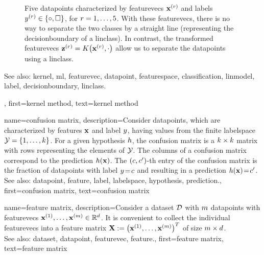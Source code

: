 {{\begin{figure}[H]
\begin{center}
\end{center}
\caption{
Five \glspl{datapoint} characterized by \glspl{featurevec} ${\bf x}^{(r)}$ 
and \glspl{label} $y^{(r)} \in \{ \circ, \square \}$, for $r=1,\ldots,5$. 
With these \glspl{featurevec}, there is no way to separate the two classes 
by a straight line (representing the \gls{decisionboundary} of a \gls{linclass}). 
In contrast, the transformed \glspl{featurevec} ${\bf z}^{(r)} = K\big({\bf x}^{(r)},\cdot\big)$ 
allow us to separate the \glspl{datapoint} using a \gls{linclass}.  \label{fig_linsep_kernel_dict}}
\end{figure}
		See also: \gls{kernel}, \gls{ml}, \gls{featurevec}, \gls{datapoint}, \gls{featurespace}, \gls{classification}, \gls{linmodel}, \gls{label}, \gls{decisionboundary}, \gls{linclass}.},
	first={kernel method},
	text={kernel method} 
}
	

{name={confusion matrix}, 
	description={Consider \glspl{datapoint}, which are characterized 
		by \glspl{feature} ${\bf x}$ and \gls{label} $y$, having values from the finite 
		\gls{labelspace} $\mathcal{Y} = \{1,\ldots,k\}$. For a given \gls{hypothesis} $h$, 
		the confusion matrix is a $k \times k$ matrix with rows representing the elements of 
		$\mathcal{Y}$. The columns of a confusion matrix correspond to the \gls{prediction} $h({\bf x})$. 
		The $(c,c')$-th entry of the confusion matrix is the fraction of 
		\glspl{datapoint} with \gls{label} $y\!=\! c$ and resulting in a \gls{prediction} $h({\bf x})\!=\!c'$.
				\\
		See also: \gls{datapoint}, \gls{feature}, \gls{label}, \gls{labelspace}, \gls{hypothesis}, \gls{prediction}.},
	first={confusion matrix},
	text={confusion matrix} 
}


{name={feature matrix}, 
	description={Consider a \gls{dataset} $\mathcal{D}$ 
		with $m$ \glspl{datapoint} with \glspl{featurevec} ${\bf x}^{(1)},\ldots,{\bf x}^{(m)} \in \mathbb{R}^{d}$. It is convenient to 
		collect the individual \glspl{featurevec} into a \gls{feature} 
		matrix ${\bf X} := \big({\bf x}^{(1)},\ldots,{\bf x}^{(m)}\big)^{T}$ 
		of size $m \times d$.
				\\
		See also: \gls{dataset}, \gls{datapoint}, \gls{featurevec}, \gls{feature}.},
	first={feature matrix},
	text={feature matrix} 
}

